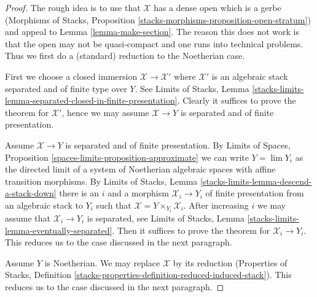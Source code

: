 \documentclass{stacks-project}
\theoremstyle{plain}
\theoremstyle{definition}
\theoremstyle{remark}
\numberwithin{equation}{subsection}
\def\lim{\mathop{\mathrm{lim}}\nolimits}
\begin{document}
\begin{proof}
The rough idea is to use that $\mathcal{X}$ has a dense open
which is a gerbe (Morphisms of Stacks, Proposition
\ref{stacks-morphisms-proposition-open-stratum})
and appeal to Lemma \ref{lemma-make-section}.
The reason this does not work is that the open may not be
quasi-compact and one runs into technical problems. Thus
we first do a (standard) reduction to the Noetherian case.

\medskip\noindent
First we choose a closed immersion
$\mathcal{X} \to \mathcal{X}'$ where $\mathcal{X}'$
is an algebraic stack separated and of finite type over $Y$.
See Limits of Stacks, Lemma
\ref{stacks-limits-lemma-separated-closed-in-finite-presentation}.
Clearly it suffices to prove the theorem for
$\mathcal{X}'$, hence we may assume $\mathcal{X} \to Y$
is separated and of finite presentation.

\medskip\noindent
Assume $\mathcal{X} \to Y$ is separated and of finite presentation.
By Limits of Spaces, Proposition \ref{spaces-limits-proposition-approximate}
we can write $Y = \lim Y_i$ as the directed limit of a system
of Noetherian algebraic spaces with affine transition morphisms.
By Limits of Stacks, Lemma \ref{stacks-limits-lemma-descend-a-stack-down}
there is an $i$ and a morphism $\mathcal{X}_i \to Y_i$ of finite presentation
from an algebraic stack to $Y_i$ such that
$\mathcal{X} = Y \times_{Y_i} \mathcal{X}_i$.
After increasing $i$ we may assume that $\mathcal{X}_i \to Y_i$
is separated, see Limits of Stacks, Lemma
\ref{stacks-limits-lemma-eventually-separated}.
Then it suffices to prove the theorem
for $\mathcal{X}_i \to Y_i$. This reduces us to the case discussed
in the next paragraph.

\medskip\noindent
Assume $Y$ is Noetherian. We may replace $\mathcal{X}$ by its
reduction (Properties of Stacks, Definition
\ref{stacks-properties-definition-reduced-induced-stack}).
This reduces us to the case discussed
in the next paragraph.


\end{proof}
\end{document}
